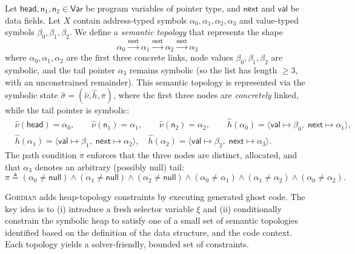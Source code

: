 \documentclass[acmsmall,screen,nonacm]{acmart}
\newcommand{\projName}{\textsc{Gordian}\xspace}
\theoremstyle{definition}
\begin{document}
\begin{example}\label{example:topology}
Let $\mathsf{head},\mathsf{n}_1,\mathsf{n}_2 \in \mathsf{Var}$ be program variables of pointer type, and $\mathsf{next}$ and $\mathsf{val}$ be data fields. Let $X$ contain address-typed symbols $\alpha_0,\alpha_1,\alpha_2,\alpha_3$ and value-typed symbols $\beta_0,\beta_1,\beta_2$. We define a \emph{semantic topology} that represents the shape
\[
\alpha_0 \xrightarrow{\mathsf{next}} \alpha_1 \xrightarrow{\mathsf{next}} \alpha_2 \xrightarrow{\mathsf{next}} \alpha_3
\]
where $\alpha_0,\alpha_1,\alpha_2$ are the first three concrete links, node values $\beta_0,\beta_1,\beta_2$ are symbolic, and the tail pointer $\alpha_3$ remains symbolic (so the list has length $\ge 3$, with an unconstrained remainder). This semantic topology is represented via the symbolic state $\hat\sigma=(\hat\nu,\hat h,\pi)$, where the first three nodes are \emph{concretely} linked, while the tail pointer is symbolic:
\begin{align*}
&\hat\nu(\mathsf{head}) = \alpha_0,\qquad
\hat\nu(\mathsf{n}_1) = \alpha_1,\qquad
\hat\nu(\mathsf{n}_2) = \alpha_2, \qquad \hat h(\alpha_0) = \langle \mathsf{val} \mapsto \beta_0,\;\mathsf{next} \mapsto \alpha_1\rangle,\\
&\hat h(\alpha_1) = \langle \mathsf{val} \mapsto \beta_1,\;\mathsf{next} \mapsto \alpha_2\rangle,\quad
\hat h(\alpha_2) = \langle \mathsf{val} \mapsto \beta_2,\;\mathsf{next} \mapsto \alpha_3\rangle.
\end{align*}
The path condition $\pi$ enforces that the three nodes are distinct, allocated, and that $\alpha_3$ denotes an arbitrary (possibly null) tail:
\[
\pi \triangleq (\alpha_0 \neq \mathsf{null}) \wedge (\alpha_1 \neq \mathsf{null}) \wedge (\alpha_2 \neq \mathsf{null})
\wedge (\alpha_0 \neq \alpha_1) \wedge (\alpha_1 \neq \alpha_2) \wedge (\alpha_0 \neq \alpha_2).
\]
\end{example}

\projName adds heap-topology constraints by executing generated ghost code. The key idea is to (i) introduce
a fresh selector variable $\xi$ and (ii) conditionally constrain the symbolic
heap to satisfy one of a small set of semantic topologies identified based on the definition of the data structure, and the code context. Each topology yields a solver-friendly, bounded set of constraints.
\end{document}
